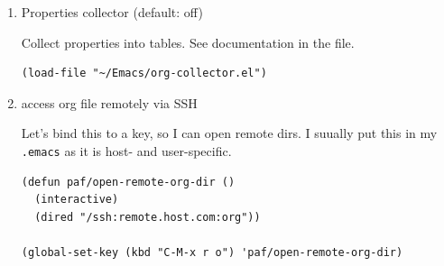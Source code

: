 \documentclass[11pt]{article}
\begin{document}
\begin{enumerate}
Make sure archiving preserves the same tree structure, including when
archiving subtrees.  \href{https://orgmode.org/worg/org-hacks.html\#org4265b4c}{source on worg}

\begin{verbatim}
(defun my-org-inherited-no-file-tags ()
  (let ((tags (org-entry-get nil "ALLTAGS" 'selective))
        (ltags (org-entry-get nil "TAGS")))
    (mapc (lambda (tag)
            (setq tags
                  (replace-regexp-in-string (concat tag ":") "" tags)))
          (append org-file-tags (when ltags (split-string ltags ":" t))))
    (if (string= ":" tags) nil tags)))
\end{verbatim}

This used to work, but \texttt{org-extract-archive-file} is no longer defined.

\begin{verbatim}
(defadvice org-archive-subtree
    (around my-org-archive-subtree-low-level activate)
  (let ((tags (my-org-inherited-no-file-tags))
        (org-archive-location
         (if (save-excursion (org-back-to-heading)
                             (> (org-outline-level) 1))
             (concat (car (split-string org-archive-location "::"))
                     "::* "
                     (car (org-get-outline-path)))
           org-archive-location)))
    ad-do-it
    (with-current-buffer (find-file-noselect (org-extract-archive-file))
      (save-excursion
        (while (org-up-heading-safe))
        (org-set-tags tags)))))
\end{verbatim}
\item Properties collector (default: off)
\label{sec:org8098378}

Collect properties into tables. See documentation in the file.

\begin{verbatim}
(load-file "~/Emacs/org-collector.el")
\end{verbatim}
\item access org file remotely via SSH
\label{sec:org2a8ff13}

Let's bind this to a key, so I can open remote dirs. I suually put
this in my \texttt{.emacs} as it is host- and user-specific.

\begin{verbatim}
(defun paf/open-remote-org-dir ()
  (interactive)
  (dired "/ssh:remote.host.com:org"))

(global-set-key (kbd "C-M-x r o") 'paf/open-remote-org-dir)
\end{verbatim}


\end{enumerate}
\end{document}
